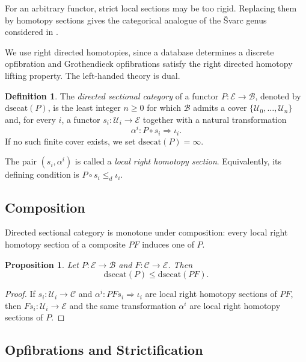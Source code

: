\documentclass[12pt]{amsart}
\newtheorem{prop}[teo]{Proposition}
\theoremstyle{definition}
\newtheorem{definition}[teo]{Definition}
\theoremstyle{remark}
\numberwithin{figure}{section}%
\newcommand{\Ba}{\mathcal{B}}
\newcommand{\CC}{\mathcal{C}}
\newcommand{\E}{\mathcal{E}}
\newcommand{\Uc}{\mathcal{U}}
\begin{document}
For an arbitrary functor, strict local sections may be too rigid.
Replacing them by homotopy sections gives the categorical analogue of the
\v{S}varc genus considered in
\cite{Baues-Isaac,carcaciacampos2026weakstrongfibrationsfunctors}.

We use right directed homotopies, since a database determines a discrete
opfibration and Grothendieck opfibrations satisfy the right directed
homotopy lifting property. The left-handed theory is dual.

\begin{definition}\label{def:directed_sectional_category}
The \emph{directed sectional category} of a functor
\(P\colon\E\to\Ba\), denoted by \(\mathrm{dsecat}(P)\), is the least
integer \(n\geq0\) for which \(\Ba\) admits a cover
\(\{\Uc_0,\ldots,\Uc_n\}\) and, for every \(i\), a functor
\(s_i\colon\Uc_i\to\E\) together with a natural transformation
\[
\alpha^i\colon P\circ s_i\Rightarrow\iota_i.
\]
If no such finite cover exists, we set \(\mathrm{dsecat}(P)=\infty\).
\end{definition}

The pair \((s_i,\alpha^i)\) is called a \emph{local right homotopy
section}. Equivalently, its defining condition is
\(P\circ s_i\leq_d\iota_i\).

\subsection{Composition}

Directed sectional category is monotone under composition: every local
right homotopy section of a composite \(PF\) induces one of \(P\).

\begin{prop}\label{prop:dsecat_composition}
Let \(P\colon\E\to\Ba\) and \(F\colon\CC\to\E\). Then
\[
\mathrm{dsecat}(P)
\leq
\mathrm{dsecat}(P F).
\]
\end{prop}

\begin{proof}
If \(s_i\colon\Uc_i\to\CC\) and
\(\alpha^i\colon PF s_i\Rightarrow\iota_i\) are local right homotopy
sections of \(PF\), then \(F s_i\colon\Uc_i\to\E\) and the same
transformation \(\alpha^i\) are local right homotopy sections of \(P\).
\end{proof}

\subsection{Opfibrations and Strictification}
\end{document}
